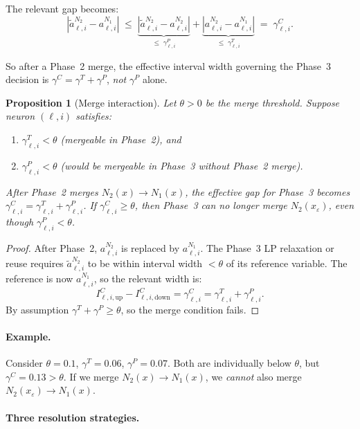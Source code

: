 \documentclass[11pt]{article}
\newtheorem{proposition}{Proposition}
\begin{document}
The relevant gap becomes:
\[
    |\tilde{a}^{N_2}_{\ell,i} - a^{N_1}_{\ell,i}|
    \;\le\;
    \underbrace{|\tilde{a}^{N_2}_{\ell,i} - a^{N_2}_{\ell,i}|}_{\le\;\gamma^P_{\ell,i}}
    +
    \underbrace{|a^{N_2}_{\ell,i} - a^{N_1}_{\ell,i}|}_{\le\;\gamma^T_{\ell,i}}
    \;=\;
    \gamma^C_{\ell,i}.
\]

So after a Phase~2 merge, the effective interval width governing the
Phase~3 decision is $\gamma^C = \gamma^T + \gamma^P$, \emph{not}
$\gamma^P$ alone.

\begin{proposition}[Merge interaction]
\label{prop:merge_interaction}
Let $\theta > 0$ be the merge threshold. Suppose neuron $(\ell, i)$
satisfies:
\begin{enumerate}
    \item $\gamma^T_{\ell,i} < \theta$ (mergeable in Phase~2), and
    \item $\gamma^P_{\ell,i} < \theta$ (would be mergeable in Phase~3 without Phase~2 merge).
\end{enumerate}
After Phase~2 merges $N_2(x) \to N_1(x)$, the effective gap for
Phase~3 becomes $\gamma^C_{\ell,i} = \gamma^T_{\ell,i} + \gamma^P_{\ell,i}$.
If $\gamma^C_{\ell,i} \ge \theta$, then Phase~3 can no longer merge
$N_2(x_\varepsilon)$, even though $\gamma^P_{\ell,i} < \theta$.
\end{proposition}

\begin{proof}
After Phase~2, $a^{N_2}_{\ell,i}$ is replaced by $a^{N_1}_{\ell,i}$.
The Phase~3 LP relaxation or reuse requires
$\tilde{a}^{N_2}_{\ell,i}$ to be within interval width $< \theta$ of its
reference variable. The reference is now $a^{N_1}_{\ell,i}$,
so the relevant width is:
\[
    I^C_{\ell,i,\text{up}} - I^C_{\ell,i,\text{down}}
    = \gamma^C_{\ell,i}
    = \gamma^T_{\ell,i} + \gamma^P_{\ell,i}.
\]
By assumption $\gamma^T + \gamma^P \ge \theta$, so the merge condition
fails.
\end{proof}

\paragraph{Example.}
Consider $\theta = 0.1$, $\gamma^T = 0.06$, $\gamma^P = 0.07$.
Both are individually below $\theta$, but $\gamma^C = 0.13 > \theta$.
If we merge $N_2(x) \to N_1(x)$, we \emph{cannot} also merge
$N_2(x_\varepsilon) \to N_1(x)$.

\paragraph{Three resolution strategies.}
\end{document}
